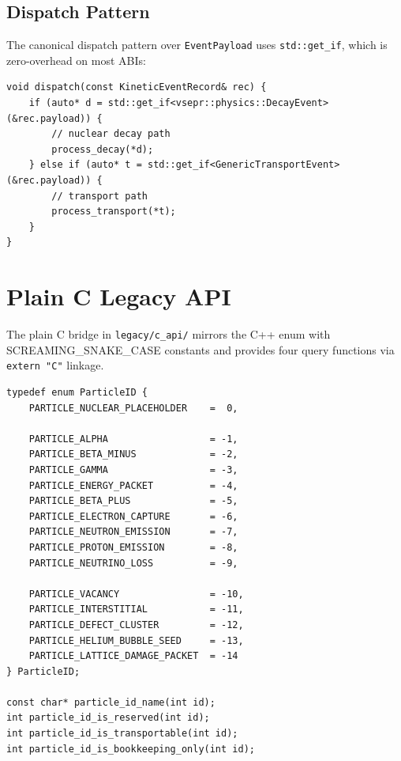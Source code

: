 \documentclass[11pt,a4paper]{article}
\begin{document}
\subsection{Dispatch Pattern}

The canonical dispatch pattern over \texttt{EventPayload} uses
\texttt{std::get\_if}, which is zero-overhead on most ABIs:

\begin{lstlisting}[style=cpp20, caption={Variant dispatch at the scheduling layer}]
void dispatch(const KineticEventRecord& rec) {
    if (auto* d = std::get_if<vsepr::physics::DecayEvent>(&rec.payload)) {
        // nuclear decay path
        process_decay(*d);
    } else if (auto* t = std::get_if<GenericTransportEvent>(&rec.payload)) {
        // transport path
        process_transport(*t);
    }
}
\end{lstlisting}

\section{Plain C Legacy API}
\label{sec:c-api}

The plain C bridge in \texttt{legacy/c\_api/} mirrors the C++ enum with
SCREAMING\_SNAKE\_CASE constants and provides four query functions via
\texttt{extern "C"} linkage.

\begin{lstlisting}[style=clang, caption={\texttt{legacy/c\_api/particle\_ids.h}}]
typedef enum ParticleID {
    PARTICLE_NUCLEAR_PLACEHOLDER    =  0,

    PARTICLE_ALPHA                  = -1,
    PARTICLE_BETA_MINUS             = -2,
    PARTICLE_GAMMA                  = -3,
    PARTICLE_ENERGY_PACKET          = -4,
    PARTICLE_BETA_PLUS              = -5,
    PARTICLE_ELECTRON_CAPTURE       = -6,
    PARTICLE_NEUTRON_EMISSION       = -7,
    PARTICLE_PROTON_EMISSION        = -8,
    PARTICLE_NEUTRINO_LOSS          = -9,

    PARTICLE_VACANCY                = -10,
    PARTICLE_INTERSTITIAL           = -11,
    PARTICLE_DEFECT_CLUSTER         = -12,
    PARTICLE_HELIUM_BUBBLE_SEED     = -13,
    PARTICLE_LATTICE_DAMAGE_PACKET  = -14
} ParticleID;

const char* particle_id_name(int id);
int particle_id_is_reserved(int id);
int particle_id_is_transportable(int id);
int particle_id_is_bookkeeping_only(int id);
\end{lstlisting}
\end{document}
